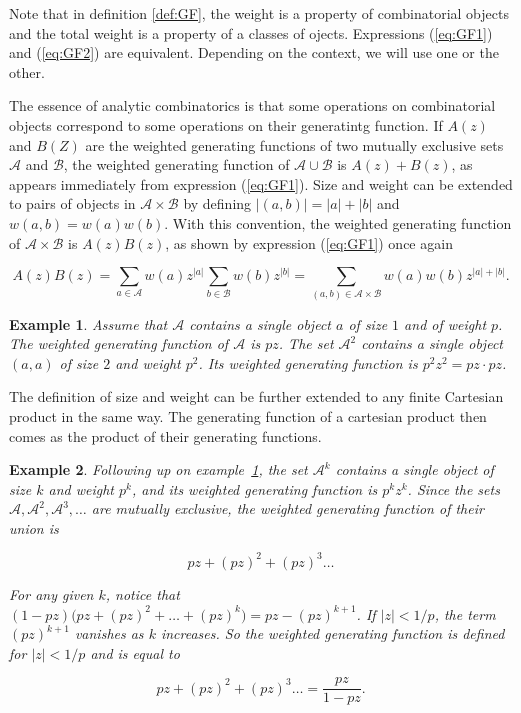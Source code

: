 \documentclass{article}
\newtheorem{example}{Example}
\begin{document}
Note that in definition \ref{def:GF}, the weight is a property of
combinatorial objects and the total weight is a property of a classes of
ojects. Expressions (\ref{eq:GF1}) and (\ref{eq:GF2}) are equivalent.
Depending on the context, we will use one or the other.

The essence of analytic combinatorics is that some operations on
combinatorial objects correspond to some operations on their generatintg
function. If $A(z)$ and $B(Z)$ are the weighted generating functions of
two mutually exclusive sets $\mathcal{A}$ and $\mathcal{B}$, the weighted
generating function of $\mathcal{A} \cup \mathcal{B}$ is $A(z) + B(z)$, as
appears immediately from expression (\ref{eq:GF1}). Size and weight can be
extended to pairs of objects in $\mathcal{A} \times \mathcal{B}$ by
defining $|(a,b)| = |a| + |b|$ and $w(a,b) = w(a)w(b)$. With this
convention, the weighted generating function of $\mathcal{A} \times
\mathcal{B}$ is $A(z)B(z)$, as shown by expression (\ref{eq:GF1})
once again

\begin{equation*}
A(z)B(z) =
\sum_{a\in \mathcal{A}}w(a)z^{|a|} \sum_{b\in \mathcal{B}}w(b)z^{|b|}
= \sum_{(a,b) \in \mathcal{A} \times \mathcal{B}} w(a)w(b)z^{|a|+|b|}.
\end{equation*}

\begin{example}
\label{ex:simple}
Assume that $\mathcal{A}$ contains a single object $a$ of size $1$ and of
weight $p$. The weighted generating function of $\mathcal{A}$ is $pz$.
The set $\mathcal{A}^2$ contains a single object $(a,a)$ of size $2$ and
weight $p^2$. Its weighted generating function is $p^2z^2 = pz \cdot pz$.
\end{example}

The definition of size and weight can be further extended to any finite
Cartesian product in the same way. The generating function of a cartesian
product then comes as the product of their generating functions.

\begin{example}
\label{ex:sequences}
Following up on example~\ref{ex:simple}, the set $\mathcal{A}^k$ contains
a single object of size $k$ and weight $p^k$, and its weighted generating
function is $p^kz^k$. Since the sets $\mathcal{A}, \mathcal{A}^2,
\mathcal{A}^3,\ldots$ are mutually exclusive, the weighted generating
function of their union is

\begin{equation*}
pz + (pz)^2 + (pz)^3 \ldots
\end{equation*}

For any given $k$, notice that $(1-pz) \big(pz + (pz)^2 + \ldots + (pz)^k
\big) = pz-(pz)^{k+1}$.  If $|z| < 1/p$, the term $(pz)^{k+1}$ vanishes as
$k$ increases. So the weighted generating function is defined for $|z| <
1/p$ and is equal to

\begin{equation*}
pz + (pz)^2 + (pz)^3 \ldots = \frac{pz}{1-pz}.
\end{equation*}
\end{example}
\end{document}
